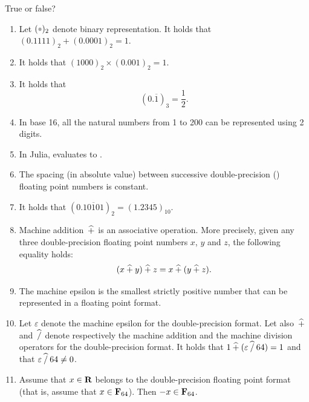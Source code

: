 \begin{exercise}
    [Summary]
    True or false?
    \begin{enumerate}
        \item Let $(\placeholder)_2$ denote binary representation.
            It holds that
            \(
                (0.1111)_2 + (0.0001)_2 = 1.
            \)
        \item It holds that
            \(
                (1000)_2 \times (0.001)_2 = 1.
            \)
        \item It holds that
            \[
                (0.\overline{1})_3 = \frac{1}{2}.
            \]
        \item In base 16, all the natural numbers from 1 to 200 can be represented using 2 digits.
        \item In Julia,  evaluates to .
        \item The spacing (in absolute value) between successive double-precision () floating point numbers is constant.
        \item It holds that $(0.\overline{10101})_2 = (1.2345)_{10}$.
        \item Machine addition~$\mathbin{\widehat +}$ is an associative operation.
            More precisely, given any three double-precision floating point numbers $x$, $y$ and $z$,
            the following equality holds:
            \[
                (x \mathbin{\widehat +} y) \mathbin{\widehat +} z = x \mathbin{\widehat +} (y \mathbin{\widehat +} z).
            \]
        \item
            The machine epsilon is the smallest strictly positive number that can be represented in a floating point format.

        \item
            Let $\varepsilon$ denote the machine epsilon for the double-precision format.
            Let also~$\mathbin{\widehat +}$ and~$\mathbin{\widehat /}$ denote respectively the machine addition and the machine division operators for the double-precision format.
            It holds that $1 \mathbin{\widehat +} (\varepsilon \mathbin{\widehat /} 64) = 1$ and that $\varepsilon \mathbin{\widehat /} 64 \neq 0$.

        \item
            Assume that $x \in \mathbf R$ belongs to the double-precision floating point format (that is,
            assume that $x \in \mathbf F_{64}$).
            Then $-x \in \mathbf F_{64}$.
    \end{enumerate}
\end{exercise}

